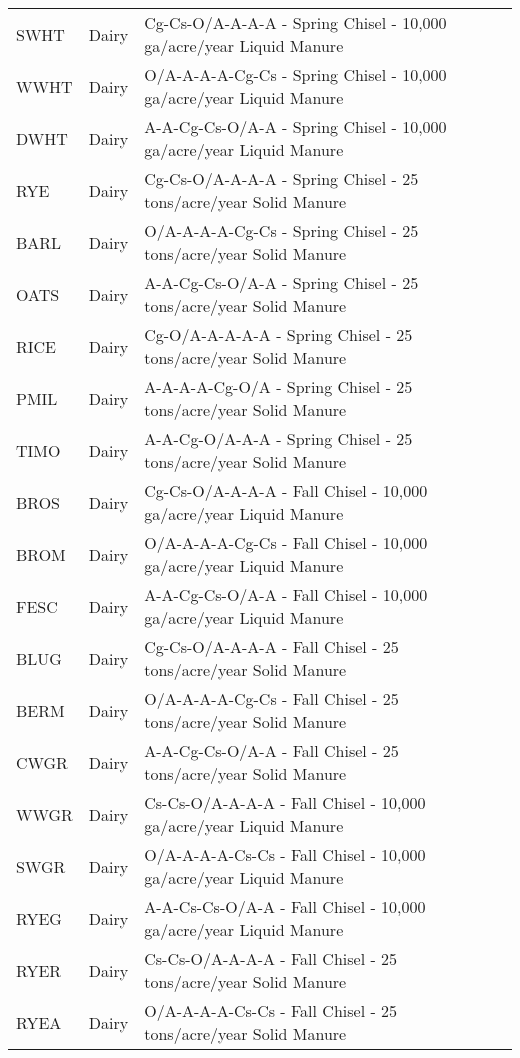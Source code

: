 \begin{landscape}
\begin{longtable}{lll}
	\hline
	\endlastfoot
  SWHT & Dairy & Cg-Cs-O/A-A-A-A - Spring Chisel - 10,000 ga/acre/year Liquid Manure  \\ 
  WWHT & Dairy & O/A-A-A-A-Cg-Cs - Spring Chisel - 10,000 ga/acre/year Liquid Manure  \\ 
  DWHT & Dairy & A-A-Cg-Cs-O/A-A - Spring Chisel - 10,000 ga/acre/year Liquid Manure  \\ 
  RYE & Dairy & Cg-Cs-O/A-A-A-A - Spring Chisel - 25 tons/acre/year Solid Manure  \\ 
  BARL & Dairy & O/A-A-A-A-Cg-Cs - Spring Chisel - 25 tons/acre/year Solid Manure  \\ 
  OATS & Dairy & A-A-Cg-Cs-O/A-A - Spring Chisel - 25 tons/acre/year Solid Manure  \\ 
  RICE & Dairy & Cg-O/A-A-A-A-A - Spring Chisel - 25 tons/acre/year Solid Manure  \\ 
  PMIL & Dairy & A-A-A-A-Cg-O/A - Spring Chisel - 25 tons/acre/year Solid Manure  \\ 
  TIMO & Dairy & A-A-Cg-O/A-A-A - Spring Chisel - 25 tons/acre/year Solid Manure  \\ 
  BROS & Dairy & Cg-Cs-O/A-A-A-A - Fall Chisel - 10,000 ga/acre/year Liquid Manure  \\ 
  BROM & Dairy & O/A-A-A-A-Cg-Cs - Fall Chisel - 10,000 ga/acre/year Liquid Manure  \\ 
  FESC & Dairy & A-A-Cg-Cs-O/A-A - Fall Chisel - 10,000 ga/acre/year Liquid Manure  \\ 
  BLUG & Dairy & Cg-Cs-O/A-A-A-A - Fall Chisel - 25 tons/acre/year Solid Manure  \\ 
  BERM & Dairy & O/A-A-A-A-Cg-Cs - Fall Chisel - 25 tons/acre/year Solid Manure  \\ 
  CWGR & Dairy & A-A-Cg-Cs-O/A-A - Fall Chisel - 25 tons/acre/year Solid Manure  \\ 
  WWGR & Dairy & Cs-Cs-O/A-A-A-A - Fall Chisel - 10,000 ga/acre/year Liquid Manure  \\ 
  SWGR & Dairy & O/A-A-A-A-Cs-Cs - Fall Chisel - 10,000 ga/acre/year Liquid Manure  \\ 
  RYEG & Dairy & A-A-Cs-Cs-O/A-A - Fall Chisel - 10,000 ga/acre/year Liquid Manure  \\ 
  RYER & Dairy & Cs-Cs-O/A-A-A-A - Fall Chisel - 25 tons/acre/year Solid Manure  \\ 
  RYEA & Dairy & O/A-A-A-A-Cs-Cs - Fall Chisel - 25 tons/acre/year Solid Manure  \\ 

\end{longtable}
\end{landscape}
